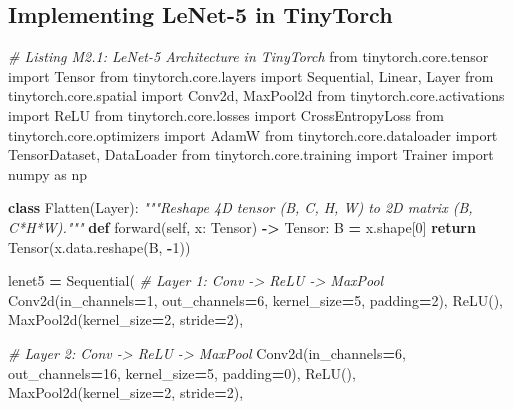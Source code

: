 \documentclass[
  letterpaper,
]{scrbook}
\newenvironment{Shaded}{\begin{snugshade}}{\end{snugshade}}
\newcommand{\CommentTok}[1]{\textcolor[rgb]{0.56,0.35,0.01}{\textit{#1}}}
\newcommand{\ControlFlowTok}[1]{\textcolor[rgb]{0.13,0.29,0.53}{\textbf{#1}}}
\newcommand{\DecValTok}[1]{\textcolor[rgb]{0.00,0.00,0.81}{#1}}
\newcommand{\ImportTok}[1]{#1}
\newcommand{\KeywordTok}[1]{\textcolor[rgb]{0.13,0.29,0.53}{\textbf{#1}}}
\newcommand{\NormalTok}[1]{#1}
\newcommand{\OperatorTok}[1]{\textcolor[rgb]{0.81,0.36,0.00}{\textbf{#1}}}
\newcommand{\VariableTok}[1]{\textcolor[rgb]{0.00,0.00,0.00}{#1}}
\begin{document}
\subsection*{Implementing LeNet-5 in
TinyTorch}\label{implementing-lenet-5-in-tinytorch}

\begin{Shaded}
\begin{Highlighting}[]
\CommentTok{\# Listing M2.1: LeNet{-}5 Architecture in TinyTorch}
\ImportTok{from}\NormalTok{ tinytorch.core.tensor }\ImportTok{import}\NormalTok{ Tensor}
\ImportTok{from}\NormalTok{ tinytorch.core.layers }\ImportTok{import}\NormalTok{ Sequential, Linear, Layer}
\ImportTok{from}\NormalTok{ tinytorch.core.spatial }\ImportTok{import}\NormalTok{ Conv2d, MaxPool2d}
\ImportTok{from}\NormalTok{ tinytorch.core.activations }\ImportTok{import}\NormalTok{ ReLU}
\ImportTok{from}\NormalTok{ tinytorch.core.losses }\ImportTok{import}\NormalTok{ CrossEntropyLoss}
\ImportTok{from}\NormalTok{ tinytorch.core.optimizers }\ImportTok{import}\NormalTok{ AdamW}
\ImportTok{from}\NormalTok{ tinytorch.core.dataloader }\ImportTok{import}\NormalTok{ TensorDataset, DataLoader}
\ImportTok{from}\NormalTok{ tinytorch.core.training }\ImportTok{import}\NormalTok{ Trainer}
\ImportTok{import}\NormalTok{ numpy }\ImportTok{as}\NormalTok{ np}

\KeywordTok{class}\NormalTok{ Flatten(Layer):}
    \CommentTok{"""Reshape 4D tensor (B, C, H, W) to 2D matrix (B, C*H*W)."""}
    \KeywordTok{def}\NormalTok{ forward(}\VariableTok{self}\NormalTok{, x: Tensor) }\OperatorTok{{-}\textgreater{}}\NormalTok{ Tensor:}
\NormalTok{        B }\OperatorTok{=}\NormalTok{ x.shape[}\DecValTok{0}\NormalTok{]}
        \ControlFlowTok{return}\NormalTok{ Tensor(x.data.reshape(B, }\OperatorTok{{-}}\DecValTok{1}\NormalTok{))}

\NormalTok{lenet5 }\OperatorTok{=}\NormalTok{ Sequential(}
    \CommentTok{\# Layer 1: Conv {-}\textgreater{} ReLU {-}\textgreater{} MaxPool}
\NormalTok{    Conv2d(in\_channels}\OperatorTok{=}\DecValTok{1}\NormalTok{, out\_channels}\OperatorTok{=}\DecValTok{6}\NormalTok{, kernel\_size}\OperatorTok{=}\DecValTok{5}\NormalTok{, padding}\OperatorTok{=}\DecValTok{2}\NormalTok{),}
\NormalTok{    ReLU(),}
\NormalTok{    MaxPool2d(kernel\_size}\OperatorTok{=}\DecValTok{2}\NormalTok{, stride}\OperatorTok{=}\DecValTok{2}\NormalTok{),}

    \CommentTok{\# Layer 2: Conv {-}\textgreater{} ReLU {-}\textgreater{} MaxPool}
\NormalTok{    Conv2d(in\_channels}\OperatorTok{=}\DecValTok{6}\NormalTok{, out\_channels}\OperatorTok{=}\DecValTok{16}\NormalTok{, kernel\_size}\OperatorTok{=}\DecValTok{5}\NormalTok{, padding}\OperatorTok{=}\DecValTok{0}\NormalTok{),}
\NormalTok{    ReLU(),}
\NormalTok{    MaxPool2d(kernel\_size}\OperatorTok{=}\DecValTok{2}\NormalTok{, stride}\OperatorTok{=}\DecValTok{2}\NormalTok{),}


\end{Highlighting}
\end{Shaded}
\end{document}
